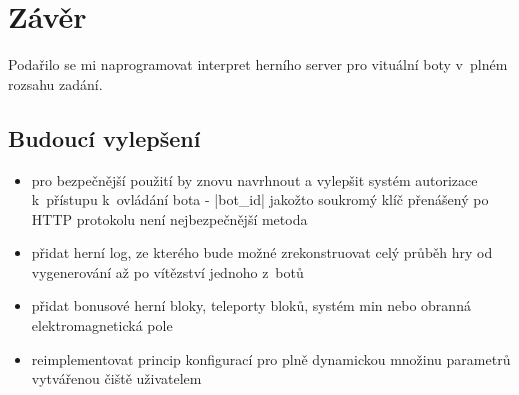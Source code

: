 \section*{Závěr}
\label{sec:ending}

Podařilo se mi naprogramovat interpret herního server pro vituální boty v~plném rozsahu zadání.

\subsection*{Budoucí vylepšení}

\begin{itemize}
 \item pro bezpečnější použití by znovu navrhnout a vylepšit systém autorizace k~přístupu k~ovládání bota - \ic|bot_id| jakožto soukromý klíč přenášený po HTTP protokolu není nejbezpečnější metoda
 \item přidat herní log, ze kterého bude možné zrekonstruovat celý průběh hry od vygenerování až po vítězství jednoho z~botů  
 \item přidat bonusové herní bloky, teleporty bloků, systém min nebo obranná elektromagnetická pole
 \item reimplementovat princip konfigurací pro plně dynamickou množinu parametrů vytvářenou čiště uživatelem
\end{itemize}

